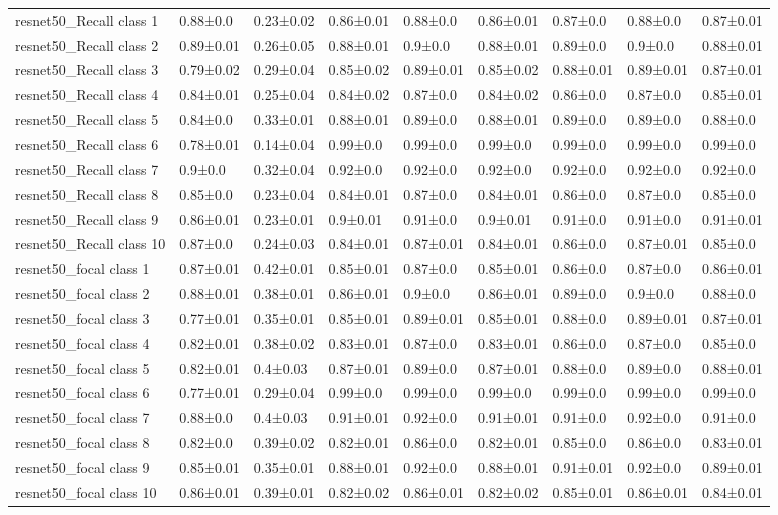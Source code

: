\begin{tabular}{lllllllll}
resnet50_Recall class 1 & 0.88±0.0 & 0.23±0.02 & 0.86±0.01 & 0.88±0.0 & 0.86±0.01 & 0.87±0.0 & 0.88±0.0 & 0.87±0.01 \\
resnet50_Recall class 2 & 0.89±0.01 & 0.26±0.05 & 0.88±0.01 & 0.9±0.0 & 0.88±0.01 & 0.89±0.0 & 0.9±0.0 & 0.88±0.01 \\
resnet50_Recall class 3 & 0.79±0.02 & 0.29±0.04 & 0.85±0.02 & 0.89±0.01 & 0.85±0.02 & 0.88±0.01 & 0.89±0.01 & 0.87±0.01 \\
resnet50_Recall class 4 & 0.84±0.01 & 0.25±0.04 & 0.84±0.02 & 0.87±0.0 & 0.84±0.02 & 0.86±0.0 & 0.87±0.0 & 0.85±0.01 \\
resnet50_Recall class 5 & 0.84±0.0 & 0.33±0.01 & 0.88±0.01 & 0.89±0.0 & 0.88±0.01 & 0.89±0.0 & 0.89±0.0 & 0.88±0.0 \\
resnet50_Recall class 6 & 0.78±0.01 & 0.14±0.04 & 0.99±0.0 & 0.99±0.0 & 0.99±0.0 & 0.99±0.0 & 0.99±0.0 & 0.99±0.0 \\
resnet50_Recall class 7 & 0.9±0.0 & 0.32±0.04 & 0.92±0.0 & 0.92±0.0 & 0.92±0.0 & 0.92±0.0 & 0.92±0.0 & 0.92±0.0 \\
resnet50_Recall class 8 & 0.85±0.0 & 0.23±0.04 & 0.84±0.01 & 0.87±0.0 & 0.84±0.01 & 0.86±0.0 & 0.87±0.0 & 0.85±0.0 \\
resnet50_Recall class 9 & 0.86±0.01 & 0.23±0.01 & 0.9±0.01 & 0.91±0.0 & 0.9±0.01 & 0.91±0.0 & 0.91±0.0 & 0.91±0.01 \\
resnet50_Recall class 10 & 0.87±0.0 & 0.24±0.03 & 0.84±0.01 & 0.87±0.01 & 0.84±0.01 & 0.86±0.0 & 0.87±0.01 & 0.85±0.0 \\
resnet50_focal class 1 & 0.87±0.01 & 0.42±0.01 & 0.85±0.01 & 0.87±0.0 & 0.85±0.01 & 0.86±0.0 & 0.87±0.0 & 0.86±0.01 \\
resnet50_focal class 2 & 0.88±0.01 & 0.38±0.01 & 0.86±0.01 & 0.9±0.0 & 0.86±0.01 & 0.89±0.0 & 0.9±0.0 & 0.88±0.0 \\
resnet50_focal class 3 & 0.77±0.01 & 0.35±0.01 & 0.85±0.01 & 0.89±0.01 & 0.85±0.01 & 0.88±0.0 & 0.89±0.01 & 0.87±0.01 \\
resnet50_focal class 4 & 0.82±0.01 & 0.38±0.02 & 0.83±0.01 & 0.87±0.0 & 0.83±0.01 & 0.86±0.0 & 0.87±0.0 & 0.85±0.0 \\
resnet50_focal class 5 & 0.82±0.01 & 0.4±0.03 & 0.87±0.01 & 0.89±0.0 & 0.87±0.01 & 0.88±0.0 & 0.89±0.0 & 0.88±0.01 \\
resnet50_focal class 6 & 0.77±0.01 & 0.29±0.04 & 0.99±0.0 & 0.99±0.0 & 0.99±0.0 & 0.99±0.0 & 0.99±0.0 & 0.99±0.0 \\
resnet50_focal class 7 & 0.88±0.0 & 0.4±0.03 & 0.91±0.01 & 0.92±0.0 & 0.91±0.01 & 0.91±0.0 & 0.92±0.0 & 0.91±0.0 \\
resnet50_focal class 8 & 0.82±0.0 & 0.39±0.02 & 0.82±0.01 & 0.86±0.0 & 0.82±0.01 & 0.85±0.0 & 0.86±0.0 & 0.83±0.01 \\
resnet50_focal class 9 & 0.85±0.01 & 0.35±0.01 & 0.88±0.01 & 0.92±0.0 & 0.88±0.01 & 0.91±0.01 & 0.92±0.0 & 0.89±0.01 \\
resnet50_focal class 10 & 0.86±0.01 & 0.39±0.01 & 0.82±0.02 & 0.86±0.01 & 0.82±0.02 & 0.85±0.01 & 0.86±0.01 & 0.84±0.01 \\
\bottomrule
\end{tabular}
